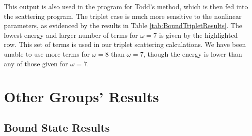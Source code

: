 \documentclass[Dissertation.tex]{subfiles}
\begin{document}
This output is also used in the program for Todd's method, which is then fed into the scattering program.  The triplet case is much more sensitive to the nonlinear parameters, as evidenced by the results in Table \ref{tab:BoundTripletResults}.  The lowest energy and larger number of terms for $\omega = 7$ is given by the highlighted row.  This set of terms is used in our triplet scattering calculations.  We have been unable to use more terms for $\omega = 8$ than $\omega = 7$, though the energy is lower than any of those given for $\omega = 7$.




\section{Other Groups' Results}
\subsection{Bound State Results}
\end{document}
